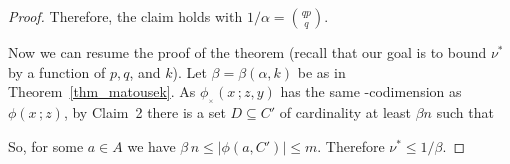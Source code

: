 \documentclass[scombinatorics.tex]{subfiles}
\begin{document}
\begin{proof}

Therefore, the claim holds with $\displaystyle1/\alpha={qp\choose q}$.

Now we can resume the proof of the theorem (recall that our goal is to bound $\nu^*$ by a function of $p,q$, and $k$).
Let $\beta=\beta(\alpha,k)$ be as in Theorem~\ref{thm_matousek}.
As $\phi\!_{_\times}\!(x\,;z,y)$ has the same \vc-codimension as $\phi(x\,;z)$, by Claim~2 there is a set $D\subseteq C'$ of cardinality at least $\beta n$ such that


So, for some $a\in A$ we have $\beta\,n\le |\phi(a,C')|\le m$.
Therefore  $\nu^*\le 1/\beta$.
\end{proof}
\end{document}
